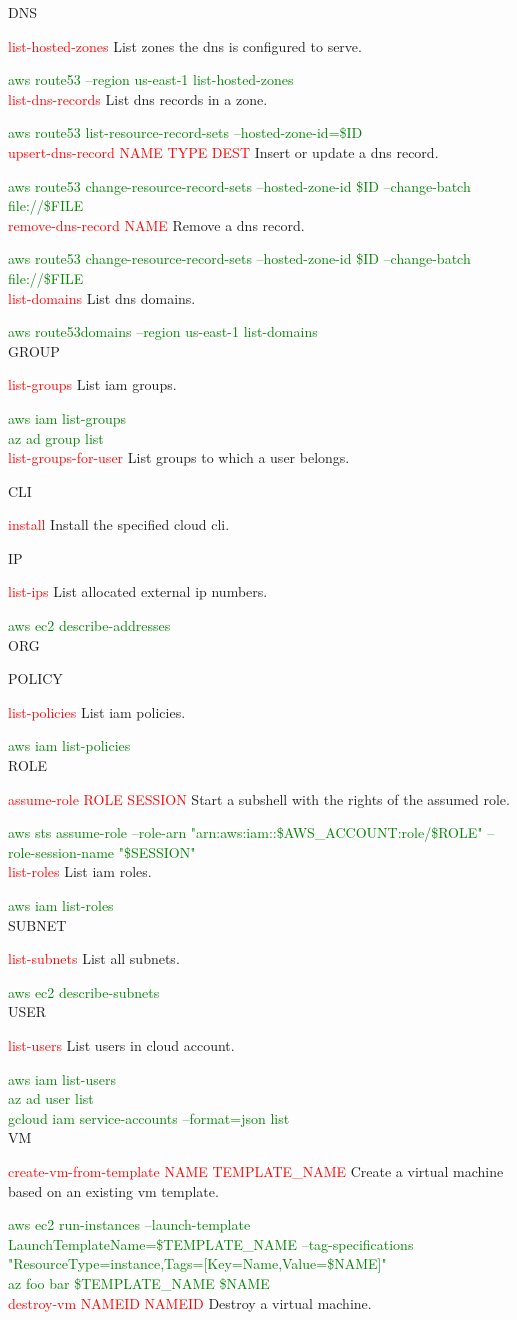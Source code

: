 \documentclass{article}
\newcommand{\cmd}[1]{\textcolor{Red}{#1}}
\newcommand{\help}[1]{#1\par}
\newcommand{\cloud}[1]{\textcolor{Green}{#1}\\}
\begin{document}
{\large DNS}\par
\cmd{list-hosted-zones} \help{List zones the dns is configured to serve.}
\cloud{aws route53 --region us-east-1 list-hosted-zones}
\cmd{list-dns-records} \help{List dns records in a zone.}
\cloud{aws route53 list-resource-record-sets --hosted-zone-id=\${ID}}
\cmd{upsert-dns-record NAME TYPE DEST} \help{Insert or update a dns record.}
\cloud{aws route53 change-resource-record-sets --hosted-zone-id \${ID} --change-batch file://\${FILE}}
\cmd{remove-dns-record NAME} \help{Remove a dns record.}
\cloud{aws route53 change-resource-record-sets --hosted-zone-id \${ID} --change-batch file://\${FILE}}
\cmd{list-domains} \help{List dns domains.}
\cloud{aws route53domains --region us-east-1 list-domains}

{\large GROUP}\par
\cmd{list-groups} \help{List iam groups.}
\cloud{aws iam list-groups}
\cloud{az ad group list}
\cmd{list-groups-for-user} \help{List groups to which a user belongs.}

{\large CLI}\par
\cmd{install} \help{Install the specified cloud cli.}

{\large IP}\par
\cmd{list-ips} \help{List allocated external ip numbers.}
\cloud{aws ec2 describe-addresses}

{\large ORG}\par

{\large POLICY}\par
\cmd{list-policies} \help{List iam policies.}
\cloud{aws iam list-policies}

{\large ROLE}\par
\cmd{assume-role ROLE SESSION} \help{Start a subshell with the rights of the assumed role.}
\cloud{aws sts assume-role --role-arn "arn:aws:iam::\${AWS\_ACCOUNT}:role/\$ROLE" --role-session-name "\$SESSION"}
\cmd{list-roles} \help{List iam roles.}
\cloud{aws iam list-roles}

{\large SUBNET}\par
\cmd{list-subnets} \help{List all subnets.}
\cloud{aws ec2 describe-subnets}

{\large USER}\par
\cmd{list-users} \help{List users in cloud account.}
\cloud{aws iam list-users}
\cloud{az ad user list}
\cloud{gcloud iam service-accounts --format=json list}

{\large VM}\par
\cmd{create-vm-from-template NAME TEMPLATE\_NAME} \help{Create a virtual machine based on an existing vm template.}
\cloud{aws ec2 run-instances --launch-template LaunchTemplateName=\${TEMPLATE\_NAME} --tag-specifications "ResourceType=instance,Tags=[{Key=Name,Value=\${NAME}}]"}
\cloud{az foo bar \${TEMPLATE\_NAME} \${NAME}}
\cmd{destroy-vm NAMEID NAMEID} \help{Destroy a virtual machine.}
\end{document}
